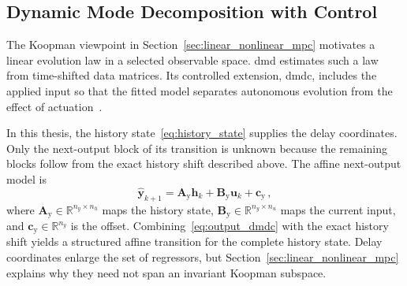 \subsection{Dynamic Mode Decomposition with Control}

The Koopman viewpoint in Section~\ref{sec:linear_nonlinear_mpc} motivates a linear evolution
law in a selected observable space. \Ac{dmd} estimates such a law from time-shifted data
matrices. Its controlled extension, \ac{dmdc}, includes the applied input so that the fitted
model separates autonomous evolution from the effect of actuation~\cite{Proctor2016}. %

In this thesis, the history state~\eqref{eq:history_state} supplies the delay coordinates. Only
the next-output block of its transition is unknown because the remaining blocks follow from
the exact history shift described above. The affine next-output model is
%
\begin{equation}
    \hat{\mathbf{y}}_{k+1}
    = \mathbf{A}_\mathrm{y}\mathbf{h}_k
    + \mathbf{B}_\mathrm{y}\mathbf{u}_k
    + \mathbf{c}_\mathrm{y} \,,
    \label{eq:output_dmdc}
\end{equation}
%
where $\mathbf{A}_\mathrm{y} \in \mathbb{R}^{n_y \times n_h}$ maps the history state,
$\mathbf{B}_\mathrm{y} \in \mathbb{R}^{n_y \times n_u}$ maps the current input, and
$\mathbf{c}_\mathrm{y} \in \mathbb{R}^{n_y}$ is the offset.
Combining~\eqref{eq:output_dmdc} with the exact history shift yields a structured affine
transition for the complete history state. Delay coordinates enlarge the set of regressors,
but Section~\ref{sec:linear_nonlinear_mpc} explains why they need not span an invariant
Koopman subspace.

